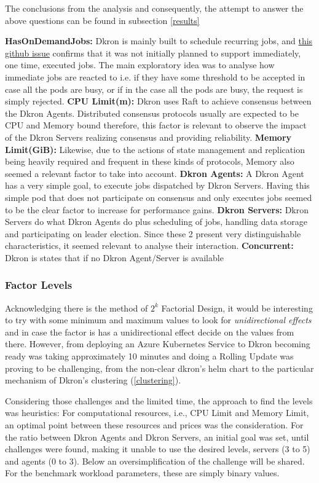 \documentclass[runningheads]{llncs}
\begin{document}
The conclusions from the analysis and consequently, the attempt to answer the above questions
can be found in subsection \ref{results}

\textbf{HasOnDemandJobs:} Dkron is mainly built to schedule recurring jobs,
and \href{https://github.com/distribworks/dkron/issues/578}{this github issue} confirms that it was not initially planned to support immediately,
one time, executed jobs. The main exploratory idea was to analyse how immediate jobs are reacted to
i.e. if they have some threshold to be accepted in case all the pods are busy, or if in the case
all the pods are busy, the request is simply rejected.
\textbf{CPU Limit(m):} Dkron uses Raft to achieve consensus between the Dkron Agents.
Distributed consensus protocols usually are expected to be CPU and Memory bound therefore,
this factor is relevant to observe the impact of the Dkron Servers realizing consensus and
providing reliability.
\textbf{Memory Limit(GiB):} Likewise, due to the actions of state management and replication
being heavily required and frequent in these kinds of protocols, Memory also seemed a relevant
factor to take into account.
\textbf{Dkron Agents:} A Dkron Agent has a very simple goal, to execute jobs dispatched by
Dkron Servers. Having this simple pod that does not participate on consensus and only executes jobs
seemed to be the clear factor to increase for performance gains.
\textbf{Dkron Servers:} Dkron Servers do what Dkron Agents do plus scheduling of jobs,
handling data storage and participating on leader election. Since these 2 present very
distinguishable characteristics, it seemed relevant to analyse their interaction.
\textbf{Concurrent:} Dkron is states that if no Dkron Agent/Server is available


\subsubsection{Factor Levels}
Acknowledging there is the method of $2^k$ Factorial Design, it would be interesting to
try with some minimum and maximum values to look for \textit{unidirectional effects} and
in case the factor is has a unidirectional effect decide on the values from there. However,
from deploying an Azure Kubernetes Service to Dkron becoming ready was taking approximately
10 minutes and doing a Rolling Update was proving to be challenging, from the non-clear dkron's
helm chart to the particular mechanism of Dkron's clustering (\ref{clustering}).

Considering those challenges and the limited time, the approach to find the levels was heuristics:
For computational resources, i.e., CPU Limit and Memory Limit, an optimal point between
    these resources and prices was the consideration.
For the ratio between Dkron Agents and Dkron Servers, an initial goal was set, until
    challenges were found, making it unable to use the desired levels, servers (3 to 5) and agents (0 to 3).
    Below an oversimplification of the challenge will be shared.
For the benchmark workload parameters, these are simply binary values.
\end{document}
